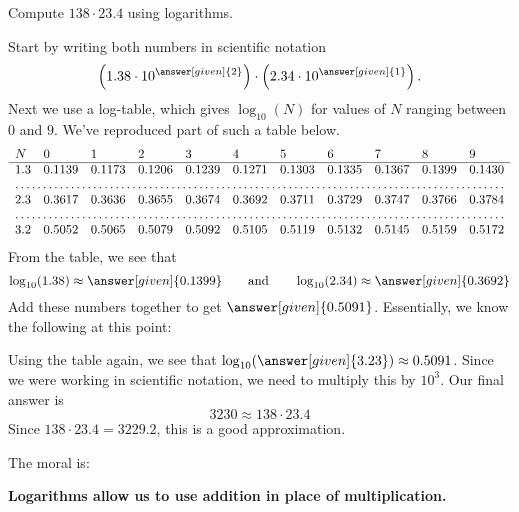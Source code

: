 \documentclass{ximera}
\begin{document}
\begin{example}
  Compute $138\cdot 23.4$ using logarithms.
  \begin{explanation}
    Start by writing both numbers in scientific notation
    \[
    \left(1.38\cdot 10^{\answer[given]{2}}\right)\cdot \left(2.34 \cdot 10^{\answer[given]{1}}\right).
    \]
    Next we use a log-table, which gives $\log_{10}(N)$ for values of
    $N$ ranging between $0$ and $9$. We've reproduced part of such a
    table below.
    \[
    \begin{array}{lllllllllll}
      N & 0 & 1 & 2 & 3 & 4 & 5 & 6 & 7 & 8 & 9 \\ \hline
      1.3 & 0.1139 & 0.1173 & 0.1206 & 0.1239 & 0.1271 & 0.1303 & 0.1335 & 0.1367 & 0.1399 & 0.1430 \\
      \hdotsfor{11} \\
      2.3 & 0.3617 & 0.3636 & 0.3655 & 0.3674 & 0.3692 & 0.3711 & 0.3729 & 0.3747 & 0.3766 & 0.3784 \\
      \hdotsfor{11} \\
      3.2 & 0.5052 & 0.5065 & 0.5079 & 0.5092 & 0.5105 & 0.5119 & 0.5132 & 0.5145 & 0.5159 & 0.5172\\
    \end{array}
    \]
    From the table, we see that 
    \[
    \log_{10}(1.38) \approx \answer[given]{0.1399}\qquad\text{and}\qquad \log_{10}(2.34)\approx \answer[given]{0.3692}
    \]
    Add these numbers together to get $\answer[given]{0.5091}$.
    Essentially, we know the following at this point:
    \begin{image}
    \end{image}
    Using the table again, we see that
    $\log_{10}(\answer[given]{3.23})\approx 0.5091$. Since we were
    working in scientific notation, we need to multiply this by
    $10^3$. Our final answer is
    \[
    3230 \approx 138\cdot 23.4
    \]
    Since $138\cdot 23.4 = 3229.2$, this is a good approximation.
  \end{explanation}
\end{example}
The moral is:
\begin{center}
      \textbf{Logarithms allow us to use addition in place of multiplication.}
\end{center}
\end{document}
